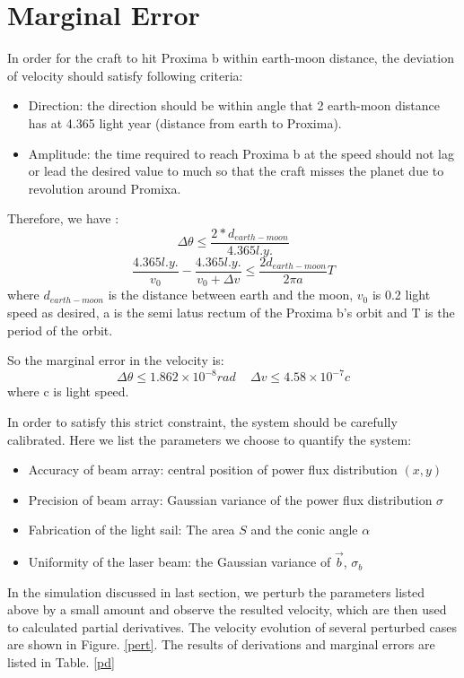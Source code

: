 \documentclass{article}
\begin{document}
\section{Marginal Error}
	In order for the craft to hit Proxima b within earth-moon distance, the deviation of velocity should satisfy following criteria:
	\begin{itemize}
		\item Direction: the direction should be within angle that 2 earth-moon distance has at 4.365 light year (distance from earth to Proxima). 
		\item Amplitude: the time required to reach Proxima b at the speed should not lag or lead the desired value to much so that the craft misses the planet due to revolution around Promixa. 
	\end{itemize}
	Therefore, we have :
	\begin{equation}
		\Delta \theta \le \frac{2*d_{earth-moon}}{4.365 l.y.}
	\end{equation}
	\begin{equation}
		\frac{4.365l.y.}{v_0}- \frac{4.365l.y.}{v_0+\Delta v}\le \frac{2d_{earth-moon}}{2\pi a} T
	\end{equation}
	where $d_{earth-moon}$ is the distance between earth and the moon, $v_0$ is 0.2 light speed as desired, a is the semi latus rectum of the Proxima b's orbit and T is the period of the orbit.
	
	So the marginal error in the velocity is:
	\begin{equation}
		\Delta \theta \le 1.862 \times 10^{-8} rad
		\,\,\,\,\,\,\,
		\Delta v \le 4.58 \times 10^{-7} c
	\end{equation}
	where c is light speed.
	
	In order to satisfy this strict constraint, the system should be carefully calibrated. Here we list the parameters we choose to quantify the system:
	\begin{itemize}
		\item Accuracy of beam array: central position of power flux distribution $(x, y)$
		\item Precision of beam array: Gaussian variance of the power flux distribution $\sigma$
		\item Fabrication of the light sail: The area $S$ and the conic angle $\alpha$
		\item Uniformity of the laser beam: the Gaussian variance of $\vec{b}$, $\sigma_b$
	\end{itemize}
	
	In the simulation discussed in last section, we perturb the parameters listed above by a small amount and observe the resulted velocity, which are then used to calculated partial derivatives. The velocity evolution of several perturbed cases are shown in Figure. \ref{pert}. The results of derivations and marginal errors are listed in Table. \ref{pd}
	
\end{document}

